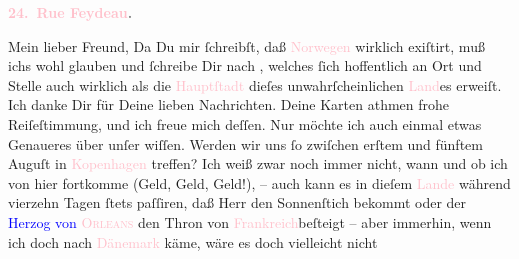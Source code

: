            \pstart
           \begin{otherlanguage}{french}\textcolor{gray}{\textbf{\textbf{\textcolor{pink}{24. Rue Feydeau}{}\ledrightnote{\textcolor{pink}{rue Feydeau}}.}}}\end{otherlanguage}\pend
           \pstart\center{}Mein lieber Freund,\pend\pstart
           Da Du mir ſchreibſt, daß \textcolor{pink}{Norwegen}{}\ledrightnote{\textcolor{pink}{Norwegen}} wirklich
               exiſtirt, muß ichs wohl glauben und ſchreibe Dir nach \label{K_L02781-1v}\label{K_L02781-1h}, welches ſich hoffentlich an Ort und Stelle auch
               wirklich als die \textcolor{pink}{Hauptſtadt}{}
               dieſes unwahrſcheinlichen \textcolor{pink}{Land}{}es erweiſt.\pend
           \pstart
           Ich danke Dir für Deine lieben Nachrichten. Deine Karten athmen frohe Reiſeſtimmung,
               und ich freue mich deſſen.\pend
           \pstart
           {\pb}Nur möchte ich auch einmal etwas Genaueres über
               unſer \label{K_L02781-2v}\label{K_L02781-2h} wiſſen. Werden wir uns ſo zwiſchen erſtem und
                  fünftem Auguſt in \textcolor{pink}{Kopenhagen}{}\ledrightnote{\textcolor{pink}{Kopenhagen}} treffen? Ich weiß zwar noch immer nicht, wann und ob ich von hier
               fortkomme (Geld, Geld, Geld!), – auch kann es in dieſem \textcolor{pink}{Lande}{} während vierzehn Tagen ſtets  paſſiren, daß Herr \label{K_L02781-3v}\label{K_L02781-3h} den Sonnenſtich bekommt oder der
                  \textcolor{blue}{Herzog von \textsc{\textcolor{pink}{Orleans}{}\ledrightnote{\textcolor{pink}{Orléans}}}}{} den Thron von \textcolor{pink}{Frankreich}{}\ledrightnote{\textcolor{pink}{Frankreich}}{ }{\pb}beſteigt – aber immerhin, wenn ich doch nach \textcolor{pink}{Dänemark}{}\ledrightnote{\textcolor{pink}{Dänemark}} käme, wäre es doch vielleicht nicht
